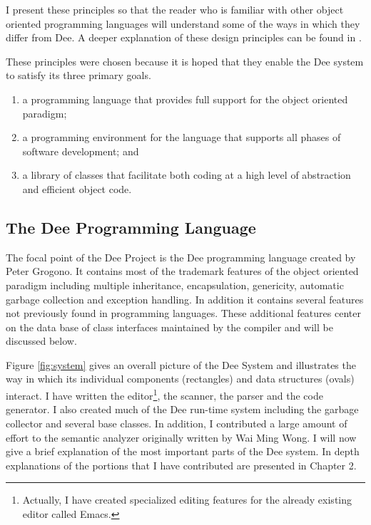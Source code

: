 I present these principles so that the reader who is familiar with other
object oriented programming languages will understand some of the ways
in which they differ from Dee. A deeper explanation of these design
principles can be found in \cite{Grogono90}.

These principles were chosen because it is hoped that they enable the
Dee system to satisfy its three primary goals.

\begin{enumerate}

\item a programming language that provides full support for the object
oriented paradigm;

\item a programming environment for the language that supports all phases
of software development; and

\item a library of classes that facilitate both coding at a high level of
abstraction and efficient object code.

\end{enumerate}

\subsection{The Dee Programming Language}

The focal point of the Dee Project is the Dee programming language
created by Peter Grogono.  It contains most of the trademark features
of the object oriented paradigm including multiple inheritance,
encapsulation, genericity, automatic garbage collection and exception
handling.  In addition it contains several features not previously
found in programming languages.  These additional features center on
the data base of class interfaces maintained by the compiler and will
be discussed below.



Figure \ref{fig:system} gives an overall picture of the Dee System and
illustrates the way in which its individual components (rectangles)
and data structures (ovals) interact.  I have written the
editor\footnote{Actually, I have created specialized editing features
for the already existing editor called Emacs.}, the scanner, the
parser and the code generator.  I also created much of the Dee
run-time system including the garbage collector and several base
classes.  In addition, I contributed a large amount of effort to the
semantic analyzer originally written by Wai Ming Wong.  I will now
give a brief explanation of the most important parts of the Dee
system.  In depth explanations of the portions that I have
contributed are presented in Chapter 2.

